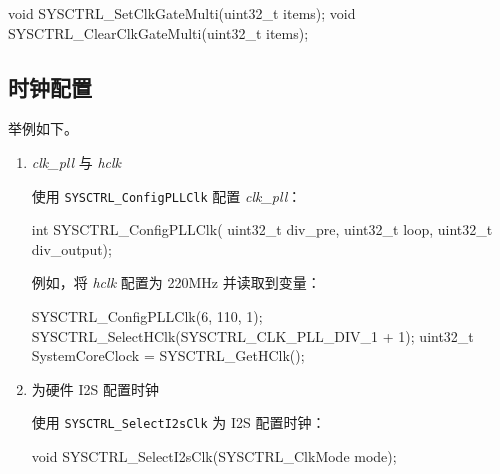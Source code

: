 \documentclass[
  12pt,
]{book}
\newenvironment{Shaded}{\begin{snugshade}}{\end{snugshade}}
\newcommand{\DataTypeTok}[1]{\textcolor[rgb]{0.13,0.29,0.53}{#1}}
\newcommand{\DecValTok}[1]{\textcolor[rgb]{0.00,0.00,0.81}{#1}}
\newcommand{\NormalTok}[1]{#1}
\begin{document}
\begin{Shaded}
\begin{Highlighting}[]
\DataTypeTok{void}\NormalTok{ SYSCTRL_SetClkGateMulti(}\DataTypeTok{uint32_t}\NormalTok{ items);}
\DataTypeTok{void}\NormalTok{ SYSCTRL_ClearClkGateMulti(}\DataTypeTok{uint32_t}\NormalTok{ items);}
\end{Highlighting}
\end{Shaded}

\hypertarget{ux65f6ux949fux914dux7f6e}{%
\subsection{时钟配置}\label{ux65f6ux949fux914dux7f6e}}

举例如下。

\begin{enumerate}
\def\labelenumi{\arabic{enumi}.}
\item
  \emph{clk\_pll} 与 \emph{hclk}

  使用 \texttt{SYSCTRL\_ConfigPLLClk} 配置 \emph{clk\_pll}：

\begin{Shaded}
\begin{Highlighting}[]
\DataTypeTok{int}\NormalTok{ SYSCTRL_ConfigPLLClk(}
\DataTypeTok{uint32_t}\NormalTok{ div_pre,}
\DataTypeTok{uint32_t}\NormalTok{ loop,}
\DataTypeTok{uint32_t}\NormalTok{ div_output);}
\end{Highlighting}
\end{Shaded}

  例如，将 \emph{hclk} 配置为 220MHz 并读取到变量：

\begin{Shaded}
\begin{Highlighting}[]
\NormalTok{SYSCTRL_ConfigPLLClk(}\DecValTok{6}\NormalTok{, }\DecValTok{110}\NormalTok{, }\DecValTok{1}\NormalTok{);}
\NormalTok{SYSCTRL_SelectHClk(SYSCTRL_CLK_PLL_DIV_1 + }\DecValTok{1}\NormalTok{);}
\DataTypeTok{uint32_t}\NormalTok{ SystemCoreClock = SYSCTRL_GetHClk();}
\end{Highlighting}
\end{Shaded}
\item
  为硬件 I2S 配置时钟

  使用 \texttt{SYSCTRL\_SelectI2sClk} 为 I2S 配置时钟：

\begin{Shaded}
\begin{Highlighting}[]
\DataTypeTok{void}\NormalTok{ SYSCTRL_SelectI2sClk(SYSCTRL_ClkMode mode);}
\end{Highlighting}
\end{Shaded}


\end{enumerate}
\end{document}
